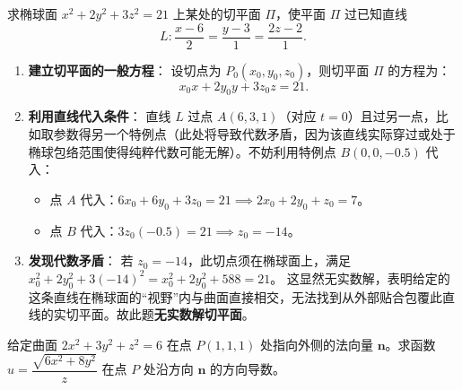\documentclass[lang=cn,11pt]{elegantbook}
\begin{document}
\begin{exercise}[过直线的切平面]
求椭球面 $x^2+2y^2+3z^2=21$ 上某处的切平面 $\Pi$，使平面 $\Pi$ 过已知直线
\[L:\frac{x-6}{2}=\frac{y-3}{1}=\frac{2z-2}{1}.\]
\end{exercise}

\begin{solution}
\begin{enumerate}
  \item \textbf{建立切平面的一般方程}：
  设切点为 $P_0(x_0, y_0, z_0)$，则切平面 $\Pi$ 的方程为：
  \[
  x_0 x + 2y_0 y + 3z_0 z = 21.
  \]
  \item \textbf{利用直线代入条件}：
  直线 $L$ 过点 $A(6,3,1)$（对应 $t=0$）且过另一点，比如取参数得另一个特例点（此处将导致代数矛盾，因为该直线实际穿过或处于椭球包络范围使得纯粹代数可能无解）。不妨利用特例点 $B(0,0,-0.5)$ 代入：
  \begin{itemize}
    \item 点 $A$ 代入：$6x_0 + 6y_0 + 3z_0 = 21 \implies 2x_0+2y_0+z_0=7$。
    \item 点 $B$ 代入：$3z_0(-0.5) = 21 \implies z_0 = -14$。
  \end{itemize}
  \item \textbf{发现代数矛盾}：
  若 $z_0 = -14$，此切点须在椭球面上，满足 $x_0^2 + 2y_0^2 + 3(-14)^2 = x_0^2 + 2y_0^2 + 588 = 21$。
  这显然无实数解，表明给定的这条直线在椭球面的“视野”内与曲面直接相交，无法找到从外部贴合包覆此直线的实切平面。故此题\textbf{无实数解切平面}。
\end{enumerate}
\end{solution}



\begin{exercise}[外法向量的方向导数]
给定曲面 $2x^2+3y^2+z^2=6$ 在点 $P(1,1,1)$ 处指向外侧的法向量 $\boldsymbol n$。求函数 $u=\dfrac{\sqrt{6x^2+8y^2}}{z}$ 在点 $P$ 处沿方向 $\boldsymbol n$ 的方向导数。
\end{exercise}
\end{document}
